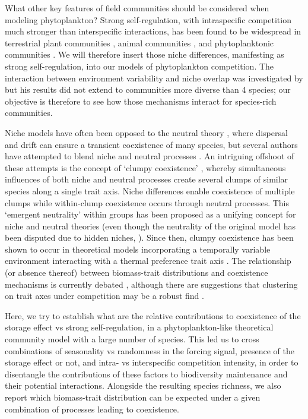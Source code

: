 \documentclass[a4paper,12pt]{article}
\begin{document}
What other key features of field communities should be considered
when modeling phytoplankton? Strong self-regulation, with intraspecific
competition much stronger than interspecific interactions, has been
found to be widespread in terrestrial plant communities \citep{adler_competition_2018},
animal communities \citep{mutshinda_what_2009}, and phytoplanktonic
communities \citep{barraquand2018coastal}. We will therefore insert
those niche differences, manifesting as strong self-regulation, into
our models of phytoplankton competition. The interaction between environment
variability and niche overlap was investigated by \citet{abrams_niche_1976}
but his results did not extend to communities more diverse than 4
species; our objective is therefore to see how those mechanisms interact
for species-rich communities.

Niche models have often been opposed to the neutral theory \citep{hubbell_unified_2001},
where dispersal and drift can ensure a transient coexistence of many
species, but several authors have attempted to blend niche and neutral
processes \citep{gravel_reconciling_2006,scheffer_self-organized_2006,carmel_using_2017}.
An intriguing offshoot of these attempts is the concept of `clumpy
coexistence' \citep{scheffer_self-organized_2006}, whereby simultaneous
influences of both niche and neutral processes create several clumps
of similar species along a single trait axis. Niche differences enable
coexistence of multiple clumps \citep{chesson_mechanisms_2000} while
within-clump coexistence occurs through neutral processes. This `emergent
neutrality' within groups \citep{holt_emergent_2006} has been proposed
as a unifying concept for niche and neutral theories (even though
the neutrality of the original model has been disputed due to hidden
niches, \citealp{barabas_emergent_2013}). Since then, clumpy coexistence
has been shown to occur in theoretical models incorporating a temporally
variable environment interacting with a thermal preference trait axis
\citep{scranton_coexistence_2016,sakavara_lumpy_2018}. The relationship
(or absence thereof) between biomass-trait distributions and coexistence
mechanisms is currently debated \citep{dandrea_challenges_2016},
although there are suggestions that clustering on trait axes under
competition may be a robust find \citep{dandrea_translucent_2018,dandrea_generalizing_2019}.

Here, we try to establish what are the relative contributions to coexistence
of the storage effect vs strong self-regulation, in a phytoplankton-like
theoretical community model with a large number of species. This led
us to cross combinations of seasonality vs randomness in the forcing
signal, presence of the storage effect or not, and intra- vs interspecific
competition intensity, in order to disentangle the contributions of
these factors to biodiversity maintenance and their potential interactions.
Alongside the resulting species richness, we also report which biomass-trait
distribution can be expected under a given combination of processes
leading to coexistence.
\end{document}
